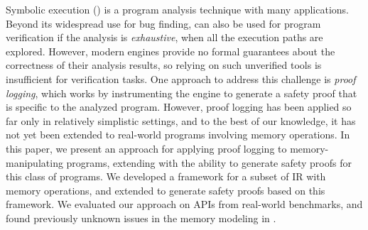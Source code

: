 
Symbolic execution (\SE) is a program analysis technique with many applications.
Beyond its widespread use for bug finding,
\SE can also be used for program verification if the analysis is \emph{exhaustive}, \ie when all the execution paths are explored.
However, modern \SE engines provide no formal guarantees about the correctness of their analysis results,
so relying on such unverified tools is insufficient for verification tasks.
One approach to address this challenge is \emph{proof logging},
which works by instrumenting the \SE engine to generate a safety proof that is specific to the analyzed program.
However, proof logging has been applied so far only in relatively simplistic settings,
and to the best of our knowledge, it has not yet been extended to real-world programs involving memory operations.
In this paper,
we present an approach for applying proof logging to memory-manipulating programs,
extending \SE with the ability to generate safety proofs for this class of programs.
We developed a \coq framework for a subset of \llvm IR with memory operations,
and extended \klee to generate safety proofs based on this framework.
We evaluated our approach on APIs from real-world benchmarks,
and found previously unknown issues in the memory modeling in \klee.

